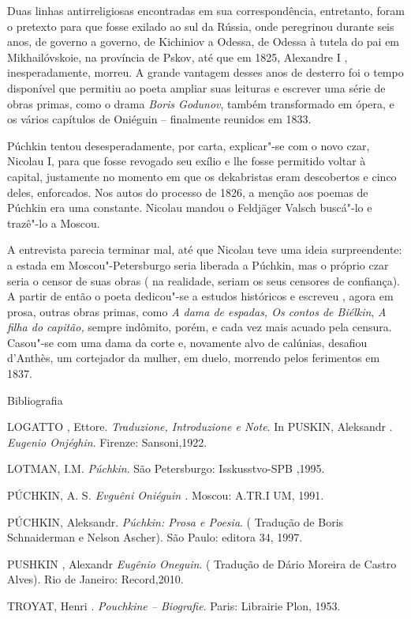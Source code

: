 Duas linhas antirreligiosas encontradas em sua correspondência,
entretanto, foram o pretexto para que fosse exilado ao sul da Rússia,
onde peregrinou durante seis anos, de governo a governo, de Kichiniov a
Odessa, de Odessa à tutela do pai em Mikhailóvskoie, na província de
Pskov, até que em 1825, Alexandre I , inesperadamente, morreu. A grande
vantagem desses anos de desterro foi o tempo disponível que permitiu ao
poeta ampliar suas leituras e escrever uma série de obras primas, como o
drama \emph{Boris Godunov}, também transformado em ópera, e os vários
capítulos de Oniéguin -- finalmente reunidos em 1833.

Púchkin tentou desesperadamente, por carta, explicar"-se com o novo czar,
Nicolau I, para que fosse revogado seu exílio e lhe fosse permitido
voltar à capital, justamente no momento em que os dekabristas eram
descobertos e cinco deles, enforcados. Nos autos do processo de 1826, a
menção aos poemas de Púchkin era uma constante. Nicolau mandou o
Feldjäger Valsch buscá"-lo e trazê"-lo a Moscou.

A entrevista parecia terminar mal, até que Nicolau teve uma ideia
surpreendente: a estada em Moscou"-Petersburgo seria liberada a Púchkin,
mas o próprio czar seria o censor de suas obras ( na realidade, seriam
os seus censores de confiança). A partir de então o poeta dedicou"-se a
estudos históricos e escreveu , agora em prosa, outras obras primas,
como \emph{A dama de espadas, Os contos de Biélkin}, \emph{A filha do
capitão,} sempre indômito, porém, e cada vez mais acuado pela censura.
Casou"-se com uma dama da corte e, novamente alvo de calúnias, desafiou
d'Anthès, um cortejador da mulher, em duelo, morrendo pelos ferimentos
em 1837.

Bibliografia

LOGATTO , Ettore. \emph{Traduzione, Introduzione e Note}. In PUSKIN,
Aleksandr . \emph{Eugenio Onjéghin}. Firenze: Sansoni,1922.

LOTMAN, I.M. \emph{Púchkin}. São Petersburgo: Isskusstvo-SPB ,1995.

PÚCHKIN, A. S\emph{. Evguêni Oniéguin .} Moscou: A.TR.I UM, 1991.

PÚCHKIN, Aleksandr. \emph{Púchkin: Prosa e Poesia}. ( Tradução de Boris
Schnaiderman e Nelson Ascher). São Paulo: editora 34, 1997.

PUSHKIN , Alexandr \emph{Eugênio Oneguin}. ( Tradução de Dário Moreira
de Castro Alves). Rio de Janeiro: Record,2010.

TROYAT, Henri . \emph{Pouchkine -- Biografie}. Paris: Librairie Plon,
1953.

